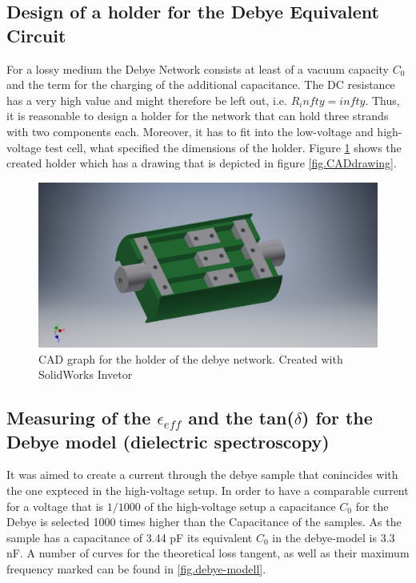 \subsection{Design of a holder for the Debye Equivalent Circuit}
For a lossy medium the Debye Network consists at least of a vacuum capacity $C_0$ and the term for the charging of the additional capacitance. The DC resistance has a very high value and might therefore be left out, i.e. $R_infty=infty$. Thus, it is reasonable to design a holder for the network that can hold three strands with two components each. Moreover, it has to fit into the low-voltage and high-voltage test cell, what specified the dimensions of the holder.  
Figure \ref{fig.CADgraph} shows the created holder which has a drawing that is depicted in figure \ref{fig.CADdrawing}.

\begin{figure}[h!tb]
\includegraphics[width=\textwidth]{figures/Method/CAD_MODEL/Gesamtanordnung.jpg}
\caption{CAD graph for the holder of the debye network. Created with SolidWorks Invetor}
\label{fig.CADgraph}
\end{figure}




    

\subsection{Measuring of the $\epsilon_{eff}$ and the tan($\delta$) for the Debye model (dielectric spectroscopy)}
\label{spectroscopy}
It was aimed to create a current through the debye sample that conincides with the one expteced in the high-voltage setup. In order to have a comparable current for a voltage that is $1/1000$ of the high-voltage setup a capacitance $C_0$ for the Debye is selected 1000 times higher than the Capacitance of the samples. As the sample has a capacitance of 3.44 pF its equivalent $C_0$ in the debye-model is 3.3 nF.
A number of curves for the theoretical loss tangent, as well as their maximum frequency marked can be found in \ref{fig.debye-modell}.

